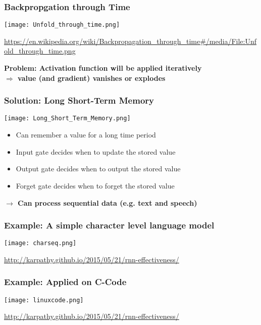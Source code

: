\begin{frame}[fragile]
  \frametitle{Backpropgation through Time}
    \begin{center}
          \texttt{[image: Unfold\_through\_time.png]}
          
          
          {\tiny \url{https://en.wikipedia.org/wiki/Backpropagation_through_time#/media/File:Unfold_through_time.png} }
          
    \vspace{1.5em}
    \textbf{Problem: Activation function will be applied iteratively\\ $\Rightarrow$ value (and gradient) vanishes or explodes}
    \end{center}
\end{frame}

\begin{frame}
  \frametitle{Solution: Long Short-Term Memory}
    \begin{center}
        \texttt{[image: Long\_Short\_Term\_Memory.png]}
        \begin{itemize}
          \item Can remember a value for a long time period
          \item Input gate decides when to update the stored value
          \item Output gate decides when to output the stored value
          \item Forget gate decides when to forget the stored value
        \end{itemize}
        \textbf{$\rightarrow$ Can process sequential data (e.g. text and speech)}
    \end{center}
\end{frame}

\begin{frame}
  \frametitle{Example: A simple character level language model}
    \begin{center}
        \texttt{[image: charseq.png]}

        \url{http://karpathy.github.io/2015/05/21/rnn-effectiveness/}
    \end{center}
\end{frame}

\begin{frame}
  \frametitle{Example: Applied on C-Code}
    \begin{center}
        \texttt{[image: linuxcode.png]}
        
        \url{http://karpathy.github.io/2015/05/21/rnn-effectiveness/}
    \end{center}
\end{frame}

